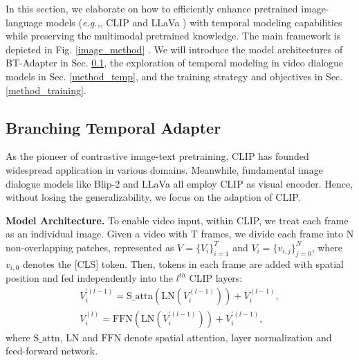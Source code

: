 \documentclass{article} \usepackage{iclr2024_conference,times}
\begin{document}
In this section, we elaborate on how to efficiently enhance pretrained image-language models (\textit{e.g.,}, CLIP \citep{radford2021learning} and LLaVa \citep{liu2023visual}) with temporal modeling capabilities while preserving the multimodal pretrained knowledge. The main framework is depicted in Fig. \ref{image_method} . We will introduce the model architectures of BT-Adapter in Sec. \ref{method_arch}, the exploration of temporal modeling in video dialogue models in Sec. \ref{method_temp}, and the training strategy and objectives in Sec. \ref{method_training}.

\vspace{-0.5em}

\subsection{Branching Temporal Adapter} \label{method_arch}

\vspace{-0.5em}

As the pioneer of contrastive image-text pretraining, CLIP \citep{radford2021learning} has founded widespread application in various domains. Meanwhile, fundamental image dialogue models like Blip-2 \citep{li2023blip} and LLaVa \citep{liu2023visual} all employ CLIP as visual encoder. Hence, without losing the generalizability, we focus on the adaption of CLIP.

\noindent \textbf{Model Architecture.} 
To enable video input, within CLIP, we treat each frame as an individual image. Given a video with T frames, we divide each frame into N non-overlapping patches, represented as $V = \{V_i\}_{i=1}^T$ and $V_i = \{v_{i,j}\}_{j=0}^N$, where $v_{i,0}$ denotes the [CLS] token. Then, tokens in each frame are added with spatial position and fed independently into the $l^{th}$ CLIP layers:
\begin{equation}
\begin{aligned}
    V_i^{'(l-1)} = \mathrm{S\_attn}(\mathrm{LN}(V_i^{(l-1)})) + V_i^{(l-1)}, \\
    V_i^{(l)} = \mathrm{FFN}(\mathrm{LN}(V_i^{'(l-1)})) + V_i^{'(l-1)}, \label{s_att}
\end{aligned}
\end{equation}
where $\mathrm{S\_attn}$, $\mathrm{LN}$ and $\mathrm{FFN}$ denote spatial attention, layer normalization and feed-forward network.
\end{document}
